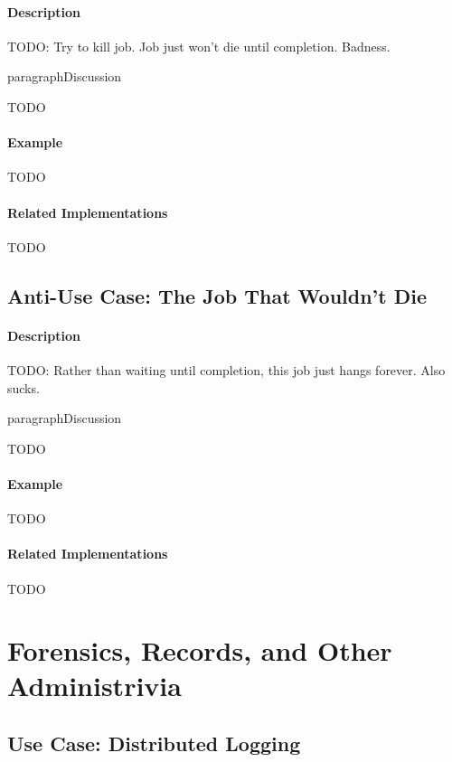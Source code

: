 \paragraph{Description}

{\Large TODO:} Try to kill job.  Job just won't die until completion.  Badness.

paragraph{Discussion}

{\Large TODO}

\paragraph{Example}

{\Large TODO}

\paragraph{Related Implementations}

{\Large TODO}

\subsection{Anti-Use Case: The Job That Wouldn't Die}

\paragraph{Description}

{\Large TODO:} Rather than waiting until completion, this job just hangs forever.  Also sucks.

paragraph{Discussion}

{\Large TODO}

\paragraph{Example}

{\Large TODO}

\paragraph{Related Implementations}

{\Large TODO}

\section{Forensics, Records, and Other Administrivia}

\subsection{Use Case: Distributed Logging}

